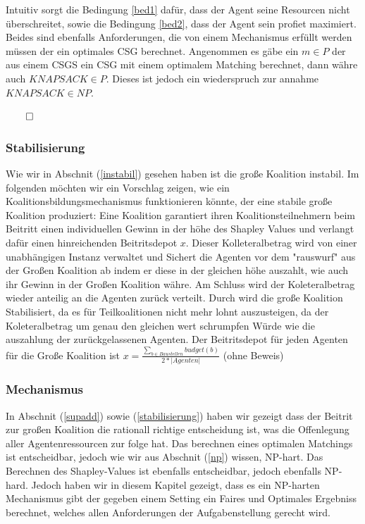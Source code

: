 Intuitiv sorgt die Bedingung \ref{bed1} dafür, dass der Agent seine Resourcen nicht überschreitet, sowie die Bedingung \ref{bed2}, dass der Agent sein profiet maximiert. Beides sind ebenfalls Anforderungen, die von einem Mechanismus erfüllt werden müssen der ein optimales CSG berechnet.
Angenommen es gäbe ein $m\in P$ der aus einem CSGS ein CSG mit einem optimalem Matching berechnet, dann währe auch $KNAPSACK\in P$. Dieses ist jedoch ein wiederspruch zur annahme $KNAPSACK\in NP$.
\begin{flushright}
  $\qed$
\end{flushright}

\subsubsection*{Stabilisierung}
\label{stabilisierung}
Wie wir in Abschnit (\ref{instabil}) gesehen haben ist die große Koalition instabil. Im folgenden möchten wir ein Vorschlag zeigen, wie ein Koalitionsbildungsmechanismus funktionieren könnte, der eine stabile große Koalition produziert:
Eine Koalition garantiert ihren Koalitionsteilnehmern beim Beitritt einen individuellen Gewinn in der höhe des Shapley Values und verlangt dafür einen hinreichenden Beitritsdepot $x$. Dieser Kolleteralbetrag wird von einer unabhängigen Instanz verwaltet und Sichert die Agenten vor dem "rauswurf" aus der Großen Koalition ab indem er diese in der gleichen höhe auszahlt, wie auch ihr Gewinn in der Großen Koalition währe. Am Schluss wird der Koleteralbetrag wieder anteilig an die Agenten zurück verteilt. Durch wird die große Koalition Stabilisiert, da es für Teilkoalitionen nicht mehr lohnt auszusteigen, da der Koleteralbetrag um genau den gleichen wert schrumpfen Würde wie die auszahlung der zurückgelassenen Agenten. Der Beitritsdepot für jeden Agenten für die Große Koalition ist $x=\frac{\sum_{b\in Baustellen} budget(b)}{2*|Agenten|}$ (ohne Beweis)

\subsubsection*{Mechanismus}
In Abschnit (\ref{supadd}) sowie (\ref{stabilisierung}) haben wir gezeigt dass der Beitrit zur großen Koalition die rationall richtige entscheidung ist, was die Offenlegung aller Agentenressourcen zur folge hat.
Das berechnen eines optimalen Matchings ist entscheidbar, jedoch wie wir aus Abschnit (\ref{np}) wissen, NP-hart.
Das Berechnen des Shapley-Values ist ebenfalls entscheidbar, jedoch ebenfalls NP-hard.
Jedoch haben wir in diesem Kapitel gezeigt, dass es ein NP-harten Mechanismus gibt der gegeben einem Setting ein Faires und Optimales Ergebniss berechnet, welches allen Anforderungen der Aufgabenstellung gerecht wird.
